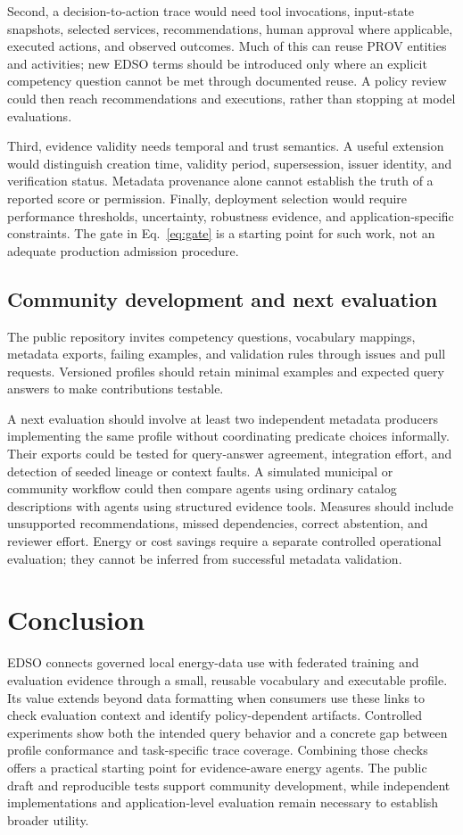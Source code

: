 \documentclass[conference]{IEEEtran}
\begin{document}
Second, a decision-to-action trace would need tool invocations, input-state snapshots, selected services, recommendations, human approval where applicable, executed actions, and observed outcomes. Much of this can reuse PROV entities and activities; new EDSO terms should be introduced only where an explicit competency question cannot be met through documented reuse. A policy review could then reach recommendations and executions, rather than stopping at model evaluations.

Third, evidence validity needs temporal and trust semantics. A useful extension would distinguish creation time, validity period, supersession, issuer identity, and verification status. Metadata provenance alone cannot establish the truth of a reported score or permission. Finally, deployment selection would require performance thresholds, uncertainty, robustness evidence, and application-specific constraints. The gate in Eq.~\eqref{eq:gate} is a starting point for such work, not an adequate production admission procedure.

\subsection{Community development and next evaluation}
The public repository invites competency questions, vocabulary mappings, metadata exports, failing examples, and validation rules through issues and pull requests. Versioned profiles should retain minimal examples and expected query answers to make contributions testable.

A next evaluation should involve at least two independent metadata producers implementing the same profile without coordinating predicate choices informally. Their exports could be tested for query-answer agreement, integration effort, and detection of seeded lineage or context faults. A simulated municipal or community workflow could then compare agents using ordinary catalog descriptions with agents using structured evidence tools. Measures should include unsupported recommendations, missed dependencies, correct abstention, and reviewer effort. Energy or cost savings require a separate controlled operational evaluation; they cannot be inferred from successful metadata validation.

\section{Conclusion}
EDSO connects governed local energy-data use with federated training and evaluation evidence through a small, reusable vocabulary and executable profile. Its value extends beyond data formatting when consumers use these links to check evaluation context and identify policy-dependent artifacts. Controlled experiments show both the intended query behavior and a concrete gap between profile conformance and task-specific trace coverage. Combining those checks offers a practical starting point for evidence-aware energy agents. The public draft and reproducible tests support community development, while independent implementations and application-level evaluation remain necessary to establish broader utility.
\end{document}
